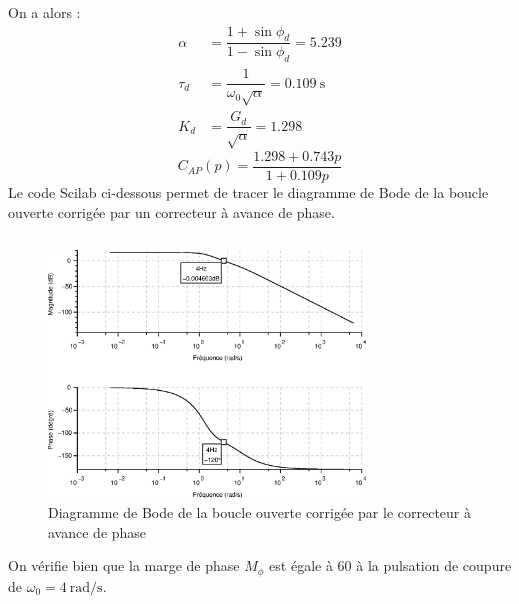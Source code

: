 On a alors :
\begin{align*}
    \alpha&=\dfrac{1+\sin\phi_d}{1-\sin\phi_d}=5.239 \\
    \tau_d&=\dfrac{1}{\omega_0\sqrt\alpha}=\SI{0.109}{\second}\\
       K_d&=\dfrac{G_d}{\sqrt\alpha}=1.298
\end{align*}
\[
C_{AP}(p)=\dfrac{1.298 + 0.743p } {1 + 0.109p}
\]
Le code Scilab ci-dessous permet de tracer le diagramme de Bode de la boucle
ouverte corrigée par un correcteur à avance de phase.
\inputminted{scilab}{scilab/code_q8_chap_correction.sce}
\begin{figure}
    \centering
    \includegraphics[width=0.75\textwidth]{fig/chap_correction/bode_BOCAP.eps}
    \caption{Diagramme de Bode de la boucle ouverte corrigée par le correcteur
    à avance de phase}
\end{figure}
On vérifie bien que la marge de phase $M_\phi$ est égale à \SI{60}{\degreeSI}
à la pulsation de coupure de $\omega_0=\SI{4}{\radian\per\second}$.
